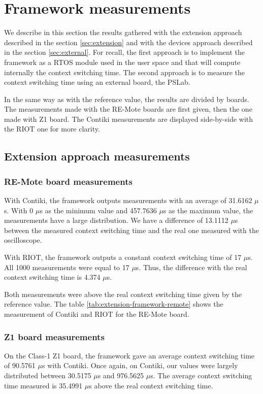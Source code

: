 \section{Framework measurements\label{sect:frame-measure}}

We describe in this section the results gathered with the extension approach described in the section \ref{sec:extension} and with the devices approach described in the section \ref{sec:external}.
For recall, the first approach is to implement the framework as a RTOS module used in the user space and that will compute internally the context switching time.
The second approach is to measure the context switching time using an external board, the PSLab.

In the same way as with the reference value, the results are divided by boards.
The measurements made with the RE-Mote boards are first given, then the one made with Z1 board.
The Contiki measurements are displayed side-by-side with the RIOT one for more clarity.

\subsection{Extension approach measurements}

\subsubsection{RE-Mote board measurements}
With Contiki, the framework outputs measurements with an average of 31.6162 $\mu$s.
With 0 $\mu$s as the minimum value and 457.7636 $\mu$s as the maximum value, the measurements have a large distribution.
We have a difference of 13.1112 $\mu$s between the measured context switching time and the real one measured with the oscilloscope.

With RIOT, the framework outputs a constant context switching time of 17 $\mu$s.
All 1000 measurements were equal to 17 $\mu$s.
Thus, the difference with the real context switching time is 4.374 $\mu$s.

Both measurements were above the real context switching time given by the reference value.
The table \ref{tab:extension-framework-remote} shows the measurement of Contiki and RIOT for the RE-Mote board.



\subsubsection{Z1 board measurements}
On the Class-1 Z1 board, the framework gave an average context switching time of 90.5761 $\mu$s with Contiki.
Once again, on Contiki, our values were largely distributed between 30.5175 $\mu$s and 976.5625 $\mu$s.
The average context switching time measured is 35.4991 $\mu$s above the real context switching time.

